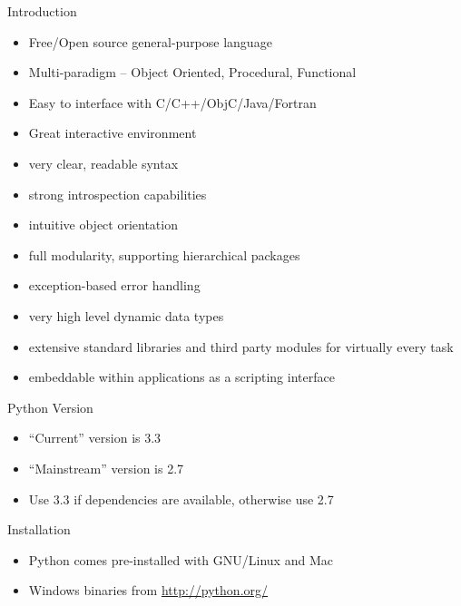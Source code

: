 \documentclass[12pt,handout]{beamer}
\begin{document}
\begin{frame}{Introduction}

\begin{itemize}
\item Free/Open source general-purpose language
\item Multi-paradigm -- Object Oriented, Procedural, Functional
\item Easy to interface with C/C++/ObjC/Java/Fortran
\item Great interactive environment
\item very clear, readable syntax
\item strong introspection capabilities
\item intuitive object orientation
\item full modularity, supporting hierarchical packages
\item exception-based error handling
\item very high level dynamic data types
\item extensive standard libraries and third party modules for virtually every task
\item embeddable within applications as a scripting interface

\end{itemize}
\end{frame}

\begin{frame}{Python Version}

\begin{itemize}
\item ``Current'' version is 3.3
\item ``Mainstream'' version is 2.7
\item Use 3.3 if dependencies are available, otherwise use 2.7

\end{itemize}
\end{frame}

\begin{frame}{Installation}

\begin{itemize}
\item Python comes pre-installed with GNU/Linux and Mac
\item Windows binaries from \url{http://python.org/}

\end{itemize}
\end{frame}
\end{document}
